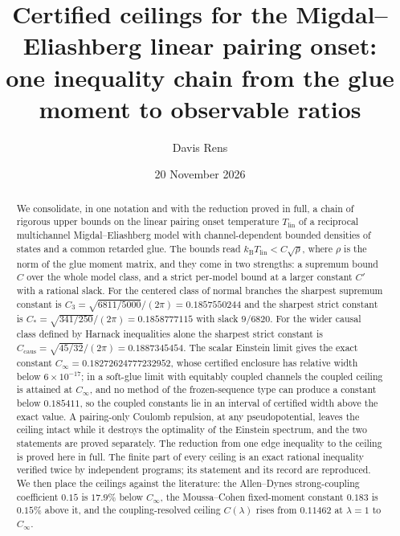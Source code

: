 \documentclass[aps,10pt,superscriptaddress,floatfix,amsmath,amssymb,nofootinbib]{revtex4-2}
\newcommand{\kb}{k_{\mathrm B}}
\newcommand{\Tlin}{T_{\mathrm{lin}}}
\newcommand{\Cinf}{C_\infty}
\newcommand{\Cthree}{C_{3}}
\newcommand{\Cstar}{C_{*}}
\newcommand{\Ccaus}{C_{\mathrm{caus}}}
\begin{document}
\title{Certified ceilings for the Migdal--Eliashberg linear pairing onset:\\
one inequality chain from the glue moment to observable ratios}

\author{Davis Rens}

\date{20 November 2026}

\begin{abstract}
We consolidate, in one notation and with the reduction proved in full, a chain of
rigorous upper bounds on the linear pairing onset temperature $\Tlin$ of a reciprocal
multichannel Migdal--Eliashberg model with channel-dependent bounded densities of states
and a common retarded glue. The bounds read $\kb\Tlin<C\sqrt{\rho}$, where $\rho$ is the
norm of the glue moment matrix, and they come in two strengths: a supremum bound
$C$ over the whole model class, and a strict per-model bound at a larger constant
$C'$ with a rational slack. For the centered class of normal branches the sharpest
supremum constant is $\Cthree=\sqrt{6811/5000}/(2\pi)=0.1857550244$ and the sharpest
strict constant is $\Cstar=\sqrt{341/250}/(2\pi)=0.1858777115$ with slack $9/6820$. For
the wider causal class defined by Harnack inequalities alone the sharpest strict constant
is $\Ccaus=\sqrt{45/32}/(2\pi)=0.1887345454$. The scalar Einstein limit gives the exact
constant $\Cinf=0.18272624777232952$, whose certified enclosure has relative width below
$6\times10^{-17}$; in a soft-glue limit with equitably coupled channels the coupled ceiling
is attained at $\Cinf$, and no method of the frozen-sequence type can produce a constant
below $0.185411$, so the coupled constants lie in an interval of certified width above the
exact value. A pairing-only Coulomb repulsion, at any pseudopotential, leaves the ceiling
intact while it destroys the optimality of the Einstein spectrum, and the two statements
are proved separately. The reduction from one edge inequality to the ceiling is proved
here in full. The finite part of every ceiling is an exact rational inequality verified
twice by independent programs; its statement and its record are reproduced. We then place
the ceilings against the literature: the Allen--Dynes strong-coupling coefficient $0.15$ is
$17.9\%$ below $\Cinf$, the Moussa--Cohen fixed-moment constant $0.183$ is $0.15\%$ above it, and
the coupling-resolved ceiling $C(\lambda)$ rises from $0.11462$ at $\lambda=1$ to $\Cinf$.

\end{abstract}
\end{document}
